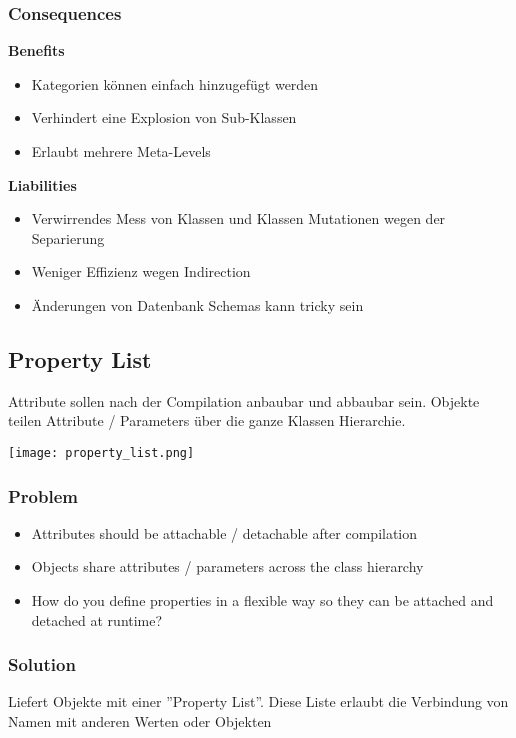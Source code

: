 \subsubsection{Consequences}
\textbf{Benefits}
\begin{itemize}
    \item Kategorien können einfach hinzugefügt werden
    \item Verhindert eine Explosion von Sub-Klassen
    \item Erlaubt mehrere Meta-Levels
\end{itemize}
\vspace{10pt}
\textbf{Liabilities}
\begin{itemize}
    \item Verwirrendes Mess von Klassen und Klassen Mutationen wegen der Separierung
    \item Weniger Effizienz wegen Indirection
    \item Änderungen von Datenbank Schemas kann tricky sein
\end{itemize}


\subsection{Property List}

Attribute sollen nach der Compilation anbaubar und abbaubar sein. Objekte teilen Attribute / Parameters über die ganze Klassen Hierarchie.

\texttt{[image: property\_list.png]}

\subsubsection{Problem}
\begin{itemize}
    \item Attributes should be attachable / detachable after compilation
    \item Objects share attributes / parameters across the class hierarchy
    \item How do you define properties in a flexible way so they can be attached and detached at runtime?
\end{itemize}

\subsubsection{Solution}
Liefert Objekte mit einer ''Property List''. Diese Liste erlaubt die Verbindung von Namen mit anderen Werten oder Objekten

